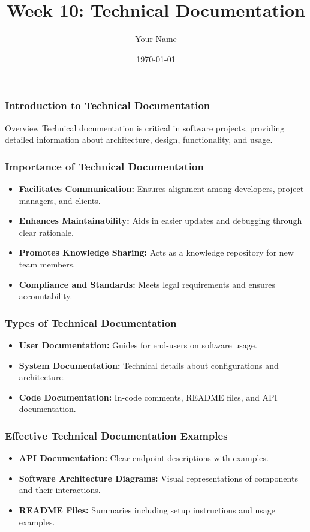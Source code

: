 \documentclass{beamer}
\title{Week 10: Technical Documentation}
\author{Your Name}
\institute{Your Institution}
\date{\today}
\begin{document}
\frame{\titlepage}

\begin{frame}[fragile]
    \frametitle{Introduction to Technical Documentation}
    \begin{block}{Overview}
        Technical documentation is critical in software projects, providing detailed information about architecture, design, functionality, and usage.
    \end{block}
\end{frame}

\begin{frame}[fragile]
    \frametitle{Importance of Technical Documentation}
    \begin{itemize}
        \item \textbf{Facilitates Communication:} Ensures alignment among developers, project managers, and clients.
        \item \textbf{Enhances Maintainability:} Aids in easier updates and debugging through clear rationale.
        \item \textbf{Promotes Knowledge Sharing:} Acts as a knowledge repository for new team members.
        \item \textbf{Compliance and Standards:} Meets legal requirements and ensures accountability.
    \end{itemize}
\end{frame}

\begin{frame}[fragile]
    \frametitle{Types of Technical Documentation}
    \begin{itemize}
        \item \textbf{User Documentation:} Guides for end-users on software usage.
        \item \textbf{System Documentation:} Technical details about configurations and architecture.
        \item \textbf{Code Documentation:} In-code comments, README files, and API documentation.
    \end{itemize}
\end{frame}

\begin{frame}[fragile]
    \frametitle{Effective Technical Documentation Examples}
    \begin{itemize}
        \item \textbf{API Documentation:} Clear endpoint descriptions with examples.
        \item \textbf{Software Architecture Diagrams:} Visual representations of components and their interactions.
        \item \textbf{README Files:} Summaries including setup instructions and usage examples.
    \end{itemize}
\end{frame}
\end{document}

